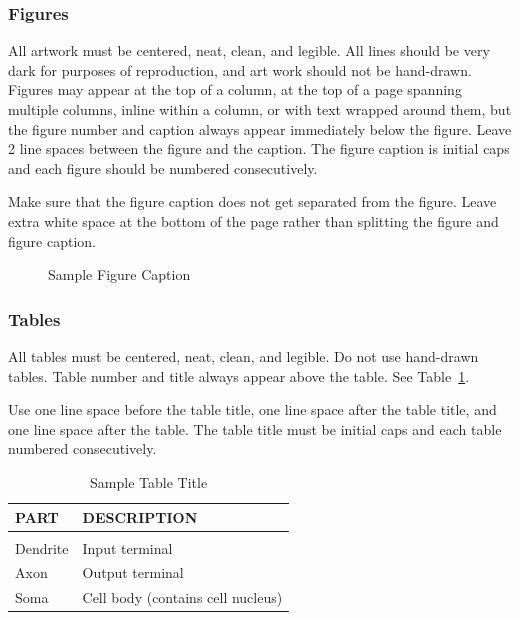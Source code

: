 \documentclass[twoside]{article} \usepackage{aistats2017}
\begin{document}
\iffalse
\subsubsection{Figures}

All artwork must be centered, neat, clean, and legible.  All lines
should be very dark for purposes of reproduction, and art work should
not be hand-drawn.  Figures may appear at the top of a column, at the
top of a page spanning multiple columns, inline within a column, or
with text wrapped around them, but the figure number and caption
always appear immediately below the figure.  Leave 2 line spaces
between the figure and the caption. The figure caption is initial caps
and each figure should be numbered consecutively.

Make sure that the figure caption does not get separated from the
figure. Leave extra white space at the bottom of the page rather than
splitting the figure and figure caption.
\begin{figure}[h]
\vspace{.3in}
\centerline{}
\vspace{.3in}
\caption{Sample Figure Caption}
\end{figure}

\subsubsection{Tables}

All tables must be centered, neat, clean, and legible. Do not use hand-drawn tables. Table number and title always appear above the table.
See Table~\ref{sample-table}.

Use one line space before the table title, one line space after the table title, and one line space after the table. The table title must be
initial caps and each table numbered consecutively.

\begin{table}[h]
\caption{Sample Table Title} \label{sample-table}
\begin{center}
\begin{tabular}{ll}
{\bf PART}  &{\bf DESCRIPTION} \\
\hline \\
Dendrite         &Input terminal \\
Axon             &Output terminal \\
Soma             &Cell body (contains cell nucleus) \\
\end{tabular}
\end{center}
\end{table}
\end{document}
